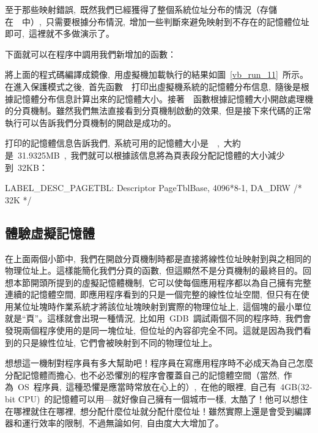 至于那些映射錯誤,~既然我們已經獲得了整個系統位址分布的情況（存儲在~~中）,~只需要根據分布情況,~增加一些判斷來避免映射到不存在的記憶體位址即可,~這裡就不多做演示了。

下面就可以在程序中調用我們新增加的函數：


將上面的程式碼編譯成鏡像,~用虛擬機加載執行的結果如圖~\ref{vb_run_11}~所示。在進入保護模式之後,~首先函數~~打印出虛擬機系統的記憶體分布信息,~隨後是根據記憶體分布信息計算出來的記憶體大小。接著~~函數根據記憶體大小開啟處理機的分頁機制。雖然我們無法直接看到分頁機制啟動的效果,~但是接下來代碼的正常執行可以告訴我們分頁機制的開啟是成功的。


打印的記憶體信息告訴我們,~系統可用的記憶體大小是~~,~大約是~31.9325MB~,~我們就可以根據該信息將為頁表段分配記憶體的大小減少到~32KB：

\begin{Command}
LABEL_DESC_PAGETBL: Descriptor PageTblBase,        4096*8-1, DA_DRW /* 32K */
\end{Command}

\subsection{體驗虛擬記憶體}

在上面兩個小節中,~我們在開啟分頁機制時都是直接將線性位址映射到與之相同的物理位址上。這樣能簡化我們分頁的函數,~但這顯然不是分頁機制的最終目的。回想本節開頭所提到的虛擬記憶體機制,~它可以使每個應用程序都以為自己擁有完整連續的記憶體空間,~即應用程序看到的只是一個完整的線性位址空間,~但只有在使用某位址塊時作業系統才將該位址塊映射到實際的物理位址上,~這個塊的最小單位就是“頁”。這樣就會出現一種情況,~比如用~GDB~調試兩個不同的程序時,~我們會發現兩個程序使用的是同一塊位址,~但位址的內容卻完全不同。這就是因為我們看到的只是線性位址,~它們會被映射到不同的物理位址上。

想想這一機制對程序員有多大幫助吧！程序員在寫應用程序時不必成天為自己怎麼分配記憶體而擔心,~也不必恐懼別的程序會覆蓋自己的記憶體空間（當然,~作為~OS~程序員,~這種恐懼是應當時常放在心上的）,~在他的眼裡,~自己有~4GB(32-bit CPU)~的記憶體可以用---就好像自己擁有一個城市一樣,~太酷了！他可以想住在哪裡就住在哪裡,~想分配什麼位址就分配什麼位址！雖然實際上還是會受到編譯器和運行效率的限制,~不過無論如何,~自由度大大增加了。

